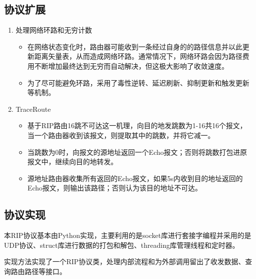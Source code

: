 	\subsection{协议扩展} %
	\label{sub:协议扩展}
		\begin{enumerate}
			\item 处理网络环路和无穷计数
				\begin{itemize}
					\item 在网络状态变化时，路由器可能收到一条经过自身的的路径信息并以此更新距离矢量表，从而造成网络环路。通常情况下，网络环路会因为路径费用不断增加最终达到无穷而自动解决，但这极大影响了收敛速度。
					\item 为了尽可能避免环路，采用了毒性逆转、延迟刷新、抑制更新和触发更新等机制。
				\end{itemize}
			\item TraceRoute\\
				\begin{itemize}
					\item 基于RIP路由16跳不可达这一机理，向目的地发跳数为1-16共16个报文，当一个路由器收到该报文，则提取其中的跳数，并将它减一。
					\item 当跳数为0时，向报文的源地址返回一个Echo报文；否则将跳数打包进原报文中，继续向目的地转发。
					\item 源地址路由器收集所有返回的Echo报文，如果5s内收到目的地址返回的Echo报文，则输出该路径；否则认为该目的地址不可达。
				\end{itemize}
		\end{enumerate}
	\subsection{协议实现} %
	\label{sub:协议实现}
		本RIP协议基本由Python实现，主要利用的是socket库进行套接字编程并采用的是UDP协议、struct库进行数据的打包和解包、threading库管理线程和定时器。
		\par 实现方法实现了一个RIP协议类，处理内部流程和为外部调用留出了收发数据、查询路由路径等接口。
